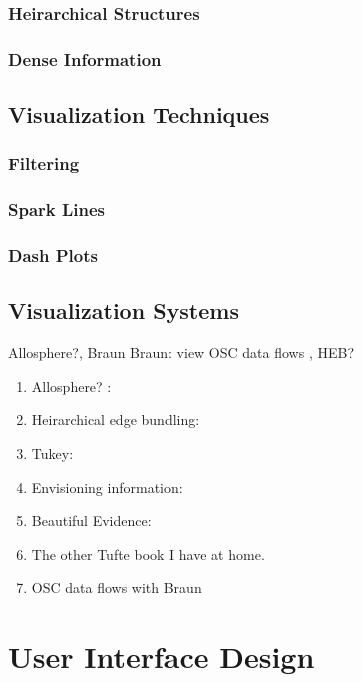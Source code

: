 		\subsubsection{Heirarchical Structures}
		\subsubsection{Dense Information}
	\subsection{Visualization Techniques}
		\subsubsection{Filtering}
		\subsubsection{Spark Lines}
		\subsubsection{Dash Plots}
	\subsection{Visualization Systems}
		Allosphere?, Braun Braun: view OSC data flows , HEB?
	\begin{enumerate}
		\item Allosphere? :
		\item Heirarchical edge bundling: 
		\item Tukey: 
		\item Envisioning information: 
		\item Beautiful Evidence: 
		\item The other Tufte book I have at home.
		\item OSC data flows with Braun 
	\end{enumerate}

			\section{User Interface Design}

